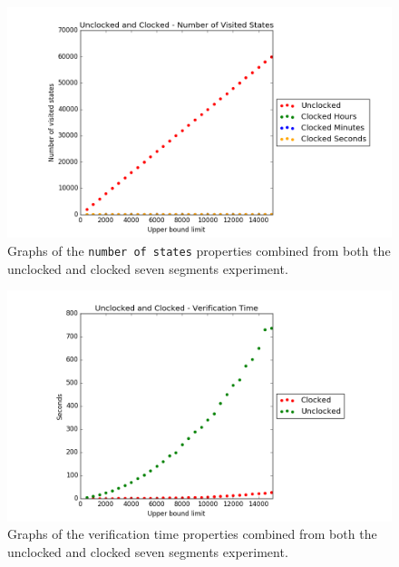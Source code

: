 \begin{figure}
    \centering
    \includegraphics[scale=0.6]{./figures/plots/combined_states.png}
\caption{Graphs of the \texttt{number of states} properties combined from both the unclocked and clocked seven segments experiment.}
\label{fig:combined_states}
\end{figure}

\begin{figure}
    \centering
    \includegraphics[scale=0.6]{./figures/plots/combined_verification_time.png}
\caption{Graphs of the verification time properties combined from both the unclocked and clocked seven segments experiment.}
\label{fig:combined_verification}
\end{figure}

